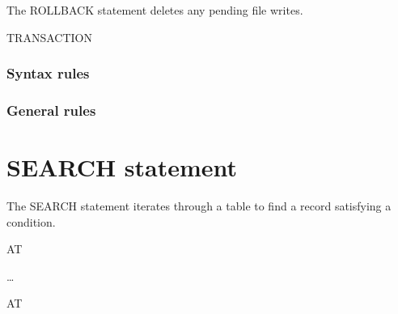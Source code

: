 The ROLLBACK statement deletes any pending file writes.

\begin{syntax}[\miscextcolour]
   TRANSACTION
\end{syntax}

\subsubsection{Syntax rules}

\subsubsection{General rules}

\section{SEARCH statement}

The SEARCH statement iterates through a table to find a record satisfying a condition.

\begin{syntax}
   \identifier
  \begin{0-1}
     \identifier
  \end{0-1}

  \begin{0-1}
    AT  \imperativestatement
  \end{0-1}

  \begin{1=}
     \condition \imperativestatement
  \end{1=} \ldots

  \begin{0-1}
  \end{0-1}
\end{syntax}

\begin{syntax}
    \identifier

  \begin{0-1}
    AT  \imperativestatement
  \end{0-1}

   \expression \imperativestatement

  \begin{0-1}
  \end{0-1}
\end{syntax}

